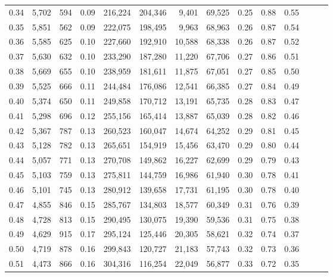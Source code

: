 \begin{tabular}{rrrrrrrrrrrrrr}
0.34 &   5,702 &    594 &  0.09 &  216,224 &  204,346 &   9,401 &  69,525 &  0.25 &  0.88 &      0.55 \\
0.35 &   5,851 &    562 &  0.09 &  222,075 &  198,495 &   9,963 &  68,963 &  0.26 &  0.87 &      0.54 \\
0.36 &   5,585 &    625 &  0.10 &  227,660 &  192,910 &  10,588 &  68,338 &  0.26 &  0.87 &      0.52 \\
0.37 &   5,630 &    632 &  0.10 &  233,290 &  187,280 &  11,220 &  67,706 &  0.27 &  0.86 &      0.51 \\
0.38 &   5,669 &    655 &  0.10 &  238,959 &  181,611 &  11,875 &  67,051 &  0.27 &  0.85 &      0.50 \\
0.39 &   5,525 &    666 &  0.11 &  244,484 &  176,086 &  12,541 &  66,385 &  0.27 &  0.84 &      0.49 \\
0.40 &   5,374 &    650 &  0.11 &  249,858 &  170,712 &  13,191 &  65,735 &  0.28 &  0.83 &      0.47 \\
0.41 &   5,298 &    696 &  0.12 &  255,156 &  165,414 &  13,887 &  65,039 &  0.28 &  0.82 &      0.46 \\
0.42 &   5,367 &    787 &  0.13 &  260,523 &  160,047 &  14,674 &  64,252 &  0.29 &  0.81 &      0.45 \\
0.43 &   5,128 &    782 &  0.13 &  265,651 &  154,919 &  15,456 &  63,470 &  0.29 &  0.80 &      0.44 \\
0.44 &   5,057 &    771 &  0.13 &  270,708 &  149,862 &  16,227 &  62,699 &  0.29 &  0.79 &      0.43 \\
0.45 &   5,103 &    759 &  0.13 &  275,811 &  144,759 &  16,986 &  61,940 &  0.30 &  0.78 &      0.41 \\
0.46 &   5,101 &    745 &  0.13 &  280,912 &  139,658 &  17,731 &  61,195 &  0.30 &  0.78 &      0.40 \\
0.47 &   4,855 &    846 &  0.15 &  285,767 &  134,803 &  18,577 &  60,349 &  0.31 &  0.76 &      0.39 \\
0.48 &   4,728 &    813 &  0.15 &  290,495 &  130,075 &  19,390 &  59,536 &  0.31 &  0.75 &      0.38 \\
0.49 &   4,629 &    915 &  0.17 &  295,124 &  125,446 &  20,305 &  58,621 &  0.32 &  0.74 &      0.37 \\
0.50 &   4,719 &    878 &  0.16 &  299,843 &  120,727 &  21,183 &  57,743 &  0.32 &  0.73 &      0.36 \\
0.51 &   4,473 &    866 &  0.16 &  304,316 &  116,254 &  22,049 &  56,877 &  0.33 &  0.72 &      0.35 \\

\end{tabular}

